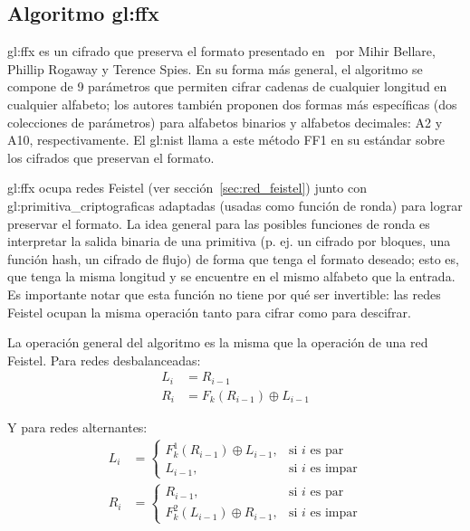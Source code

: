 %
%

\subsection{Algoritmo \texorpdfstring{\acrshort{gl:ffx}}{FFX}}
\label{sec:ffx}

\Gls{gl:ffx} es un cifrado que preserva el formato presentado en~\cite{ffx_1}
por Mihir Bellare, Phillip Rogaway y Terence Spies.  En su forma más general,
el algoritmo se compone de 9 parámetros que permiten cifrar cadenas de
cualquier longitud en cualquier alfabeto; los autores también proponen dos
formas más específicas (dos colecciones de parámetros) para alfabetos binarios
y alfabetos decimales: A2 y A10, respectivamente. El \gls{gl:nist} llama a este
método FF1 en su estándar sobre los cifrados que preservan el
formato\cite{nist_fpe}.

\Gls{gl:ffx} ocupa redes Feistel (ver sección~\ref{sec:red_feistel}) junto con
\glspl{gl:primitiva_criptografica} adaptadas (usadas como función de ronda) para
lograr preservar el formato. La idea general para las posibles funciones de
ronda es interpretar la salida binaria de una primitiva (p. ej. un cifrado por
bloques, una función hash, un cifrado de flujo) de forma que tenga el formato
deseado; esto es, que tenga la misma longitud y se encuentre en el mismo
alfabeto que la entrada. Es importante notar que esta función no tiene por qué
ser invertible: las redes Feistel ocupan la misma operación tanto para cifrar
como para descifrar.

La operación general del algoritmo es la misma que la operación de una red
Feistel. Para redes desbalanceadas:
\begin{equation}
  \begin{split}
    L_{i} &= R_{i - 1} \\
    R_{i} &= F_k(R_{i - 1}) \oplus L_{i - 1}
  \end{split}
\end{equation}

Y para redes alternantes:
\begin{equation}
  \begin{split}
    L_{i} &=
    \begin{cases}
      F^1_k(R_{i - 1}) \oplus L_{i - 1},  & \text{si } i \text{ es par} \\
      L_{i - 1},                          & \text{si } i \text{ es impar}
    \end{cases}
    \\
    R_{i} &=
    \begin{cases}
      R_{i - 1},                          & \text{si } i \text{ es par} \\
      F^2_k(L_{i - 1}) \oplus R_{i - 1},  & \text{si } i \text{ es impar}
    \end{cases}
  \end{split}
\end{equation}

